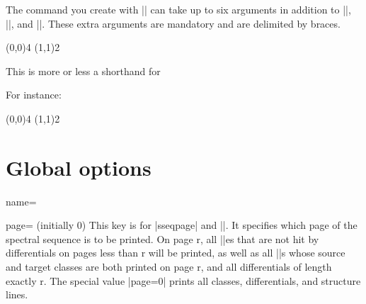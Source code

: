 \documentclass{ltxdoc}
\begin{document}
\begin{sseqdata}[name=ex1,degree={#1}{1-#1}]
\begin{command}{\sseqnewcmd\opt{*}}
The command you create with |\sseqnewcmd| can take up to six arguments in addition to |\options|, |\x|, and |\y|. These extra arguments are mandatory and are delimited by braces.
\begin{codeexample}[]
\sseqnewcmd*{}
\begin{sseqpage}
\tower[orange](0,0){4}
\tower[red](1,1){2}
\end{sseqpage}
\end{codeexample}
\end{command}

\begin{command}{\sseqnewgroup\opt{*}}
This is more or less a shorthand for
\begin{codeexample}[code only, code=white]
\sseqnewcmd\opt{*}\cscolor{(\obscurexname,\obscureyname)}
\end{codeexample}
For instance:
\begin{codeexample}[]
\sseqnewgroup*{}
\begin{sseqpage}
\tower[orange](0,0){4}
\tower[red](1,1){2}
\end{sseqpage}
\end{codeexample}
\end{command}

\section{Global options}
\begin{key}{name=}
\end{key}

\begin{key}{page= (initially 0)}
This key is for |sseqpage| and |\printpage|. It specifies which page of the spectral sequence is to be printed. On page r, all |\class|es that are not hit by differentials on pages less than r will be printed, as well as all |\structline|s whose source and target classes are both printed on page r, and all differentials of length exactly r. The special value |page=0| prints all classes, differentials, and structure lines.
\end{key}


\end{sseqdata}
\end{document}
